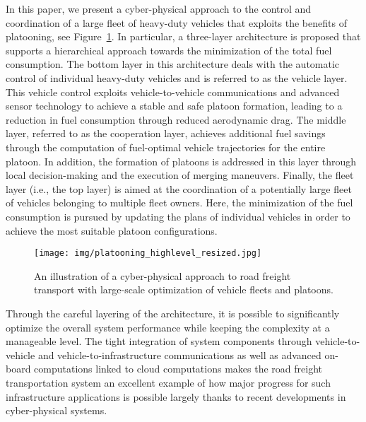 \documentclass[journal]{IEEEtran}
\begin{document}
In this paper, we present a cyber-physical approach to the control and coordination of a large fleet of heavy-duty vehicles that exploits the benefits of platooning, see Figure~\ref{fig_cartoon_highlevel}. In particular, a three-layer architecture is proposed that supports a hierarchical approach towards the minimization of the total fuel consumption. The bottom layer in this architecture deals with the automatic control of individual heavy-duty vehicles and is referred to as the vehicle layer. This vehicle control exploits vehicle-to-vehicle communications and advanced sensor technology to achieve a stable and safe platoon formation, leading to a reduction in fuel consumption through reduced aerodynamic drag. The middle layer, referred to as the cooperation layer, achieves additional fuel savings through the computation of fuel-optimal vehicle trajectories for the entire platoon. In addition, the formation of platoons is addressed in this layer through local decision-making and the execution of merging maneuvers. Finally, the fleet layer (i.e., the top layer) is aimed at the coordination of a potentially large fleet of vehicles belonging to multiple fleet owners. Here, the minimization of the fuel consumption is pursued by updating the plans of individual vehicles in order to achieve the most suitable platoon configurations.

\begin{figure}
\begin{center}
  \texttt{[image: img/platooning\_highlevel\_resized.jpg]}
  \vskip-1mm\caption{An illustration of a cyber-physical approach to road freight transport with large-scale optimization of vehicle fleets and platoons.}
  \label{fig_cartoon_highlevel}
\end{center}
\end{figure}

Through the careful layering of the architecture, it is possible to significantly optimize the overall system performance while keeping the complexity at a manageable level. The tight integration of system components through vehicle-to-vehicle and vehicle-to-infrastructure communications as well as advanced on-board computations linked to cloud computations makes the road freight transportation system an excellent example of how major progress for such infrastructure applications is possible largely thanks to recent developments in cyber-physical systems.
\end{document}
